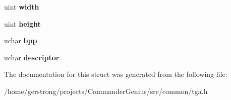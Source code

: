 \begin{DoxyCompactItemize}
\item 
\hypertarget{struct_t_g_a___h_e_a_d_e_r_a89cd181e92979f03614c0015a76fdfd0}{
uint {\bfseries width}}
\label{struct_t_g_a___h_e_a_d_e_r_a89cd181e92979f03614c0015a76fdfd0}

\item 
\hypertarget{struct_t_g_a___h_e_a_d_e_r_a6f7c3bddd888f3f20ddf7bc846c27df8}{
uint {\bfseries height}}
\label{struct_t_g_a___h_e_a_d_e_r_a6f7c3bddd888f3f20ddf7bc846c27df8}

\item 
\hypertarget{struct_t_g_a___h_e_a_d_e_r_a2ed48425281a4102728d8171bb43e86b}{
uchar {\bfseries bpp}}
\label{struct_t_g_a___h_e_a_d_e_r_a2ed48425281a4102728d8171bb43e86b}

\item 
\hypertarget{struct_t_g_a___h_e_a_d_e_r_a89afcc8fc737916f18fc1cbf1c7c7584}{
uchar {\bfseries descriptor}}
\label{struct_t_g_a___h_e_a_d_e_r_a89afcc8fc737916f18fc1cbf1c7c7584}

\end{DoxyCompactItemize}


The documentation for this struct was generated from the following file:\begin{DoxyCompactItemize}
\item 
/home/gerstrong/projects/CommanderGenius/src/common/tga.h\end{DoxyCompactItemize}
